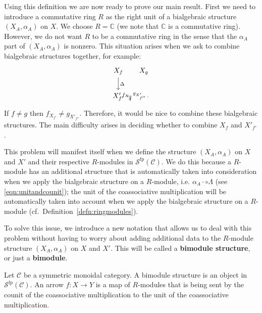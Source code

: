 \documentclass[a4paper,reqno,oneside]{article}
\begin{document}
Using this definition we are now ready to prove our main result. First we need to introduce a commutative ring $R$ as the right unit of a bialgebraic structure $(X_A,\alpha_A)$ on $X$. We choose $R = \mathbb{C}$ (we note that $\mathbb{C}$ is a commutative ring). However, we do not want $R$ to be a commutative ring in the sense that the $\alpha_A$ part of $(X_A,\alpha_A)$ is nonzero. 
This situation arises when we ask to combine bialgebraic structures together, for example:
\begin{equation} \label{eqn:mainlemma}
    \begin{tikzcd}[column sep = small]
        X_{f} & X_{g} \\
        X'_{f'} & X'_{g'}
        \arrow[""{name=0, anchor=center, inner sep=0}, "{f_{X_{f'}}}"]
        \arrow[""{name=1, anchor=center, inner sep=0}, "{f_{X_{g'}}}", shift right=5]
        \arrow["\Delta", from=1-1, to=2-1]
        \arrow["\rho"', from=2-1, to=2-2]
        \arrow[""{name=2, anchor=center, inner sep=0}, "{g_{X'_{f''}}}"{description}, draw=none, from=0, to=1]
    \end{tikzcd}
\end{equation} 
If $f \neq g$ then $f_{X_{f'}} \neq g_{X'_{f''}}$. Therefore, it would be nice to combine these bialgebraic structures. The main difficulty arises in deciding whether to combine $X_{f}$ and $X'_{f'}$. 

This problem will manifest itself when we define the structure $(X_A,\alpha_A)$ on $X$ and $X'$ and their respective $R$-modules in $\mathcal{S}^{\mathrm{fp}}(\mathcal{C})$. We do this because a $R$-module has an additional structure that is automatically taken into consideration when we apply the bialgebraic structure on a $R$-module, i.e. $\alpha_A \cdot \circ \Lambda$ (see \eqref{eqn:unitandcounit}); the unit of the coassociative multiplication will be automatically taken into account when we apply the bialgebraic structure on a $R$-module (cf.~Definition~\ref{defn:ringmodules}).  

To solve this issue, we introduce a new notation that allows us to deal with this problem without having to worry about adding additional data to the $R$-module structure $(X_A,\alpha_A)$ on $X$ and $X'$. This will be called a \textbf{bimodule structure}, or just a \textbf{bimodule}. 

\begin{defn}
    Let $\mathcal{C}$ be a symmetric monoidal category. A bimodule structure is an object in $\mathcal{S}^{\mathrm{fp}}(\mathcal{C})$. 
    An arrow $f \colon X \to Y$ is a map of $R$-modules that is being sent by the counit of the coassociative multiplication to the unit of the coassociative multiplication. 

\end{defn} 
\end{document}
